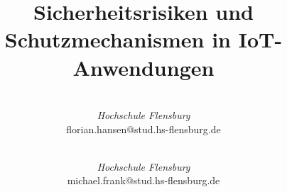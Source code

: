 \documentclass[conference]{IEEEtran}
\begin{document}
\title{Sicherheitsrisiken und Schutzmechanismen in IoT-Anwendungen}
    \author{
       \\
      \textit{Hochschule Flensburg}\\
      florian.hansen@stud.hs-flensburg.de
      
      \and

       \\
      \textit{Hochschule Flensburg}\\
      michael.frank@stud.hs-flensburg.de
    }
  \maketitle

  
  
  
  
  

  
  
  

	
	
\end{document}
